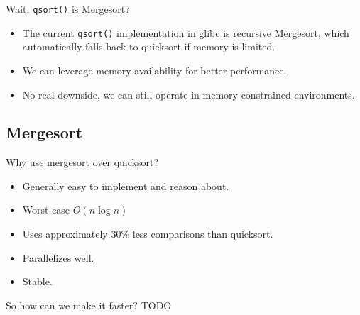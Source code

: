 \documentclass[13pt]{beamer}
\begin{document}
\begin{frame}{Wait, \texttt{qsort()} is Mergesort?}
	\pause
	\begin{itemize}[<+->]
		\item The current \texttt{qsort()} implementation in glibc is recursive
		      Mergesort, which automatically falls-back to quicksort if memory is
		      limited.
		\item We can leverage memory availability for better performance.
		\item No real downside, we can still operate in memory constrained environments.
	\end{itemize}
\end{frame}

\subsection{Mergesort}
\begin{frame}{Why use mergesort over quicksort?}
	\pause
	\begin{itemize}[<+->]
		\item Generally easy to implement and reason about.
		\item Worst case $O(n\log{n})$
		\item Uses approximately 30\% less comparisons than quicksort.
		\item Parallelizes well.
		\item Stable.
	\end{itemize}
\end{frame}

\begin{frame}{So how can we make it faster?}
  TODO
\end{frame}
\end{document}

